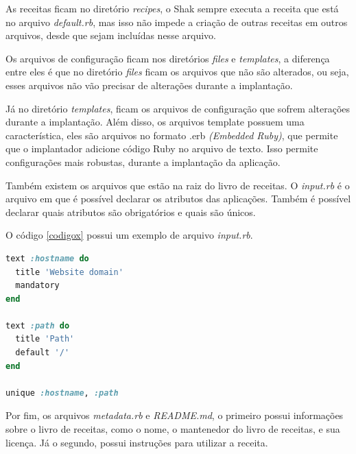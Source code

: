As receitas ficam no diretório \textit{recipes}, o Shak sempre executa a receita que está
no arquivo \textit{default.rb}, mas isso não impede a criação de outras receitas em outros arquivos,
desde que sejam incluídas nesse arquivo. 

Os arquivos de configuração ficam nos diretórios \textit{files} e \textit{templates},
a diferença entre eles é que no diretório \textit{files} ficam os arquivos que
não são alterados, ou seja, esses arquivos não vão precisar de alterações
durante a implantação. 

Já no diretório \textit{templates}, ficam os arquivos de configuração que sofrem alterações durante 
a implantação. Além disso, os arquivos template possuem uma característica, eles 
são arquivos no formato .erb \textit{(Embedded Ruby)}, que permite que o 
implantador adicione código Ruby no arquivo de texto. Isso permite configurações
mais robustas, durante a implantação da aplicação.

Também existem os arquivos que estão na raiz do livro de receitas. O \textit{input.rb}
é o arquivo em que é possível declarar os atributos das aplicações. Também é 
possível declarar quais atributos são obrigatórios e quais são únicos.

O código \ref{codigox} possui um exemplo de arquivo \textit{input.rb}.

\begin{lstlisting}[basicstyle=\ttfamily, language=Ruby,label=dice_index,caption={Exemplo de código no arquivo input.rb}, label=codigox]
text :hostname do
  title 'Website domain'                                                        
  mandatory                                                                     
end                                                                             
                                                                                
text :path do                                                                   
  title 'Path'                                                                  
  default '/'                                                                   
end                                                                             
                                                                                
unique :hostname, :path 
\end{lstlisting}

Por fim, os arquivos \textit{metadata.rb} e \textit{README.md}, o primeiro possui
informações sobre o livro de receitas, como o nome, o mantenedor do livro
de receitas, e sua licença. Já o segundo, possui instruções para utilizar a 
receita.

